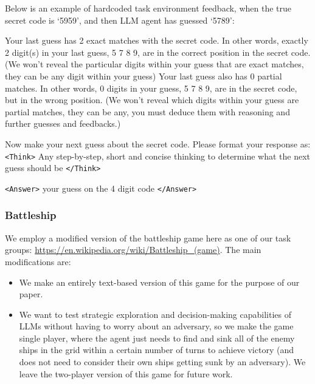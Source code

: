 \newpage

Below is an example of hardcoded task environment feedback, when the true secret code is `5959', and then LLM agent has guessed `5789':

\begin{tcolorbox}[colback=gray!20, colframe=black, title=Mastermind Task Environment Feedback]
Your last guess has 2 exact matches with the secret code. In other words, exactly 2 digit(s) in your last guess, 5 7 8 9, are in the correct position in the secret code. (We won't reveal the particular digits within your guess that are exact matches, they can be any digit within your guess) Your last guess also has 0 partial matches. In other words, 0 digits in your guess, 5 7 8 9, are in the secret code, but in the wrong position. (We won't reveal which digits within your guess are partial matches, they can be any, you must deduce them with reasoning and further guesses and feedbacks.)

Now make your next guess about the secret code. Please format your response as: \texttt{<Think>} Any step-by-step, short and concise thinking to determine what the next guess should be \texttt{</Think>}

\texttt{<Answer>} your guess on the 4 digit code \texttt{</Answer>}

\end{tcolorbox}

\newpage

\subsubsection{Battleship}\label{appendix:battleship}

We employ a modified version of the battleship game here as one of our task groups: \url{https://en.wikipedia.org/wiki/Battleship_(game)}. The main modifications are:

\begin{itemize}
    \item We make an entirely text-based version of this game for the purpose of our paper.
    \item We want to test strategic exploration and decision-making capabilities of LLMs without having to worry about an adversary, so we make the game single player, where the agent just needs to find and sink all of the enemy ships in the grid within a certain number of turns to achieve victory (and does not need to consider their own ships getting sunk by an adversary). We leave the two-player version of this game for future work.
\end{itemize}

